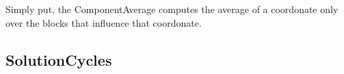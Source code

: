 \documentclass[a4paper,twoside,10pt]{report}
\begin{document}
	
	Simply put, the ComponentAverage computes the average of a coordonate only over the blocks that influence that coordonate.
		
	\subsection{SolutionCycles}
	



\clearpage
{}
\listoffigures

\clearpage
{}
\listoftables


\appendix

\end{document}

